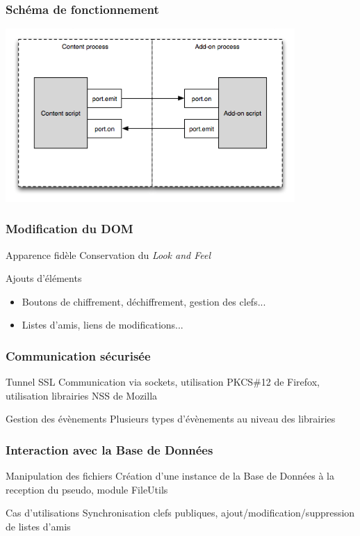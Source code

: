 \documentclass{beamer}
\begin{document}
\begin{frame}
    \frametitle{Schéma de fonctionnement}
    \begin{center}
    \includegraphics[width=11cm]{content-scripting-events.png}
    \end{center}
\end{frame}

\begin{frame}
    \frametitle{Modification du DOM}
    \begin{block}{Apparence fidèle} 
    Conservation du \emph{Look and Feel}
    \end{block}
    \begin{block}{Ajouts d'éléments}
        \begin{itemize}
            \item{Boutons de chiffrement, déchiffrement, 
            gestion des clefs...}
            \item{Listes d'amis, liens de modifications...}
        \end{itemize}
    \end{block}
\end{frame}

\begin{frame}
    \frametitle{Communication sécurisée}
    \begin{block}{Tunnel SSL}
    Communication via sockets, utilisation PKCS\#12 de Firefox,
    utilisation librairies NSS de Mozilla
    \end{block}
    \begin{block}{Gestion des évènements}
    Plusieurs types d'évènements au niveau des librairies
    \end{block}
\end{frame}

\begin{frame}
    \frametitle{Interaction avec la Base de Données}
    \begin{block}{Manipulation des fichiers}
    Création d'une instance de la Base de Données à la reception du pseudo,
    module FileUtils
    \end{block}
    \begin{block}{Cas d'utilisations}
    Synchronisation clefs publiques, ajout/modification/suppression
    de listes d'amis
    \end{block}
\end{frame}
\end{document}
